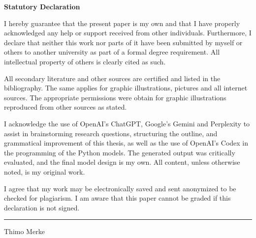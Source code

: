 \newpage \noindent
{\large \textbf{Statutory Declaration}}\vspace{2mm}

I hereby guarantee that the present paper is my own and that I have properly acknowledged any help or support received from other individuals. Furthermore, I declare that neither this work nor parts of it have been submitted by myself or others to another university as part of a formal degree requirement. All intellectual property of others is clearly cited as such.\vspace{2mm}

All secondary literature and other sources are certified and listed in the bibliography. The same applies for graphic illustrations, pictures and all internet sources. The appropriate permissions were obtain for graphic illustrations reproduced from other sources as stated.\vspace{2mm}

I acknowledge the use of OpenAI's ChatGPT, Google's Gemini and Perplexity to assist in brainstorming research questions, structuring the outline, and grammatical improvement of this thesis, as well as the use of OpenAI's Codex in the programming of the Python models. The generated output was critically evaluated, and the final model design is my own. All content, unless otherwise noted, is my original work.\vspace{2mm}

I agree that my work may be electronically saved and sent anonymized to be checked for plagiarism. I am aware that this paper cannot be graded if this declaration is not signed.\vspace{20mm}

\noindent\rule{8cm}{0.4pt}

\hspace*{0mm}Thimo Merke